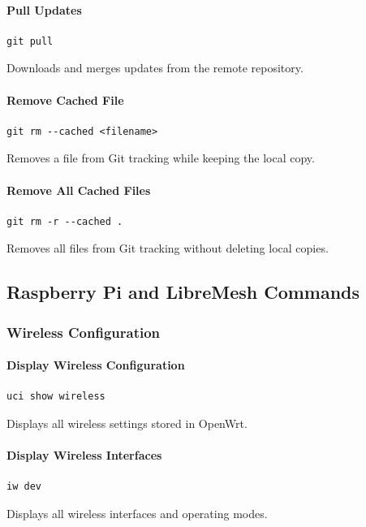 \documentclass[conference]{IEEEtran}
\begin{document}
\paragraph{Pull Updates}
\begin{verbatim}
git pull
\end{verbatim}
Downloads and merges updates from the remote repository.

\paragraph{Remove Cached File}
\begin{verbatim}
git rm --cached <filename>
\end{verbatim}
Removes a file from Git tracking while keeping the local copy.

\paragraph{Remove All Cached Files}
\begin{verbatim}
git rm -r --cached .
\end{verbatim}
Removes all files from Git tracking without deleting local copies.

\subsection{Raspberry Pi and LibreMesh Commands}

\subsubsection{Wireless Configuration}

\paragraph{Display Wireless Configuration}
\begin{verbatim}
uci show wireless
\end{verbatim}
Displays all wireless settings stored in OpenWrt.

\paragraph{Display Wireless Interfaces}
\begin{verbatim}
iw dev
\end{verbatim}
Displays all wireless interfaces and operating modes.
\end{document}
